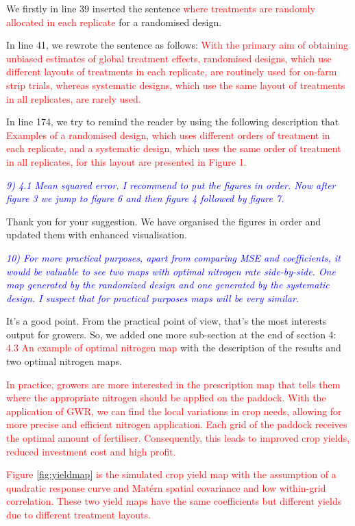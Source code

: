 \documentclass[a4paper]{article}   	%
\newcommand{\Matern}{Mat\'ern }
\newcommand{\revision}[1]{\textcolor{red}{#1}}
\newcommand{\reviewer}[1]{\textcolor{blue}{\textit{#1}}}
\begin{document}
We firstly in line 39 inserted the sentence \revision{where treatments are randomly allocated in each replicate} for a randomised design. 

In line 41, we rewrote the sentence as follows: \revision{With the primary aim of obtaining unbiased estimates of global treatment effects, randomised designs, which use different
layouts of treatments in each replicate, are routinely used for on-farm strip trials, whereas systematic designs, which use the same layout of treatments in all replicates, are rarely used.}

In line 174, we try to remind the reader by using the following description that \revision{Examples of a randomised design, which uses different orders of treatment in each replicate, and a systematic design, which uses the same order of treatment in all replicates, for this layout are presented in Figure 1.}


\reviewer{9) 4.1 Mean squared error. I recommend to put the figures in order. Now after figure 3 we jump to figure 6 and then figure 4 followed by figure 7.}

Thank you for your suggestion. We have organised the figures in order and updated them with enhanced visualisation.

\reviewer{10) For more practical purposes, apart from comparing MSE and coefficients, it would be valuable to see two maps with optimal nitrogen rate side-by-side. One map generated by the randomized design and one generated by the systematic design. I suspect that for practical purposes maps will be very similar.}

It's a good point. From the practical point of view, that's the most interests output for growers. So, we added one more sub-section at the end of section 4: 
\revision{4.3 An example of optimal nitrogen map} with the description of the results and two optimal nitrogen maps. 


\revision{In practice, growers are more interested in the prescription map that tells them where the appropriate nitrogen should be applied on the paddock. With the application of GWR, we can find the local variations in crop needs, allowing for more precise and efficient nitrogen application. Each grid of the paddock receives the optimal amount of fertiliser. Consequently, this leads to improved crop yields, reduced investment cost and high profit.}


\revision{Figure \ref{fig:yieldmap} is the simulated crop yield map with the assumption of a quadratic response curve and \Matern spatial covariance and low within-grid correlation. These two yield maps have the same coefficients but different yields due to different treatment layouts.}
\end{document}
